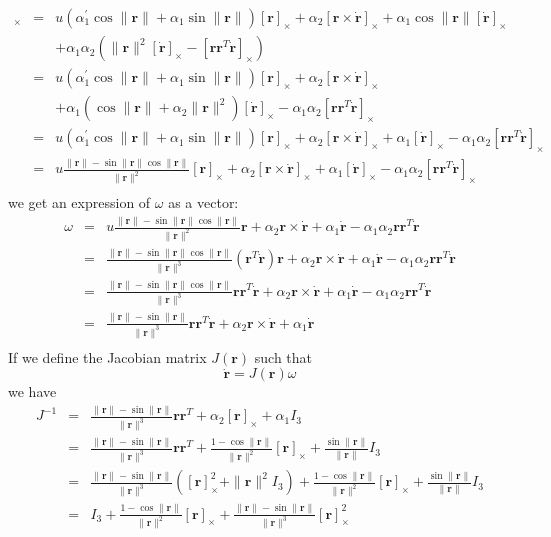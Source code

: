 \documentclass {article}
\newcommand\rot{\mathbf{r}}
\newcommand\rcross{[\rot]_{\times}}
\newcommand\omegacross{[\omega]_{\times}}
\newcommand\rdotcross{\left[\dot{\rot}\right]_{\times}}
\newcommand\normr{\|\rot\|}
\newcommand\alphap{\alpha^{\prime}}
\begin{document}
\begin{eqnarray*}
\omegacross &=&
u\left(\alphap_1 \cos\normr + \alpha_1\sin\normr\right) \rcross + \alpha_2\left[\rot\times\dot{\rot}\right]_{\times} + \alpha_1\cos\normr\rdotcross\\
&& + \alpha_1 \alpha_2 \left(\normr^2\rdotcross - \left[\rot\rot^T\dot{\rot}\right]_{\times}\right)\\
&=&u\left(\alphap_1 \cos\normr + \alpha_1\sin\normr\right) \rcross + \alpha_2\left[\rot\times\dot{\rot}\right]_{\times}\\
&& + \alpha_1\left(\cos\normr + \alpha_2\normr^2\right)\rdotcross - \alpha_1 \alpha_2\left[\rot\rot^T\dot{\rot}\right]_{\times}\\
&=&u\left(\alphap_1 \cos\normr + \alpha_1\sin\normr\right) \rcross + \alpha_2\left[\rot\times\dot{\rot}\right]_{\times} + \alpha_1\rdotcross - \alpha_1 \alpha_2\left[\rot\rot^T\dot{\rot}\right]_{\times}\\
&=&u\frac{\normr -\sin\normr\cos\normr}{\normr^2} \rcross + \alpha_2\left[\rot\times\dot{\rot}\right]_{\times} + \alpha_1\rdotcross - \alpha_1 \alpha_2\left[\rot\rot^T\dot{\rot}\right]_{\times}\\
\end{eqnarray*}
we get an expression of $\omega$ as a vector:
\begin{eqnarray*}
\omega &=&u\frac{\normr -\sin\normr\cos\normr}{\normr^2} \rot + \alpha_2\rot\times\dot{\rot} + \alpha_1\dot{\rot} - \alpha_1 \alpha_2\rot\rot^T\dot{\rot}\\
&=&\frac{\normr -\sin\normr\cos\normr}{\normr^3}(\rot^T\dot{\rot}) \rot + \alpha_2\rot\times\dot{\rot} + \alpha_1\dot{\rot} - \alpha_1 \alpha_2\rot\rot^T\dot{\rot}\\
&=&\frac{\normr -\sin\normr\cos\normr}{\normr^3}\rot\rot^T\dot{\rot} + \alpha_2\rot\times\dot{\rot} + \alpha_1\dot{\rot} - \alpha_1 \alpha_2\rot\rot^T\dot{\rot}\\
&=&\frac{\normr -\sin\normr}{\normr^3}\rot\rot^T\dot{\rot} + \alpha_2\rot\times\dot{\rot} + \alpha_1\dot{\rot}\\
\end{eqnarray*}
If we define the Jacobian matrix $J(\rot)$  such that
$$
\dot{\rot} = J(\rot)\omega
$$
we have
\begin{eqnarray*}
J^{-1} &=& \frac{\normr -\sin\normr}{\normr^3}\rot\rot^T + \alpha_2\rcross + \alpha_1 I_3\\
&=& \frac{\normr -\sin\normr}{\normr^3}\rot\rot^T + \frac{1 - \cos \normr}{\normr^2}\rcross + \frac{\sin \normr}{\normr} I_3\\
&=& \frac{\normr -\sin\normr}{\normr^3}(\rcross^2 + \normr^2 I_3) + \frac{1 - \cos \normr}{\normr^2}\rcross + \frac{\sin \normr}{\normr} I_3\\
&=& I_3  + \frac{1 - \cos \normr}{\normr^2}\rcross + \frac{\normr -\sin\normr}{\normr^3}\rcross^2\\
\end{eqnarray*}
\end{document}
